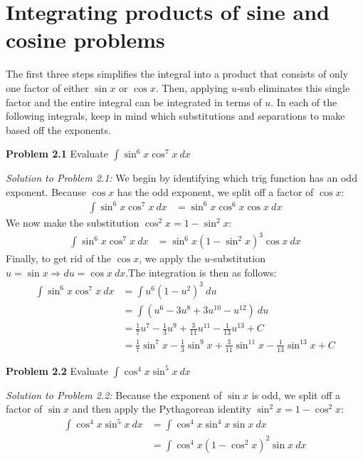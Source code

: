 \documentclass[11pt]{scrartcl}
\begin{document}
\section{Integrating products of sine and cosine problems}
\noindent 
The first three steps simplifies the integral into a product that consists of only one factor of either $\sin x$ or $\cos x$. Then, applying $u$-sub eliminates this single factor and the entire integral can be integrated in terms of $u$. In each of the following integrals, keep in mind which substitutions and separations to make based off the exponents. 
\begin{tcolorbox}[colback=purple!5!white,colframe=purple!75!black]
\textbf{Problem 2.1} Evaluate $\int{\sin ^6 x \cos ^7 x \ dx}$
\end{tcolorbox}
\noindent 
\textit{Solution to Problem 2.1:} We begin by identifying which trig function has an odd exponent. Because $\cos x$ has the odd exponent, we split off a factor of $\cos x$: 
\begin{align*}
    \int{\sin ^6 x \cos ^7 x \ dx} &=\sin ^6 x \cos ^6 x \cos x \ dx 
\end{align*}
\noindent 
We now make the substitution $\cos ^2 x=1- \sin ^2 x$: 
\begin{align*}
     \int{\sin ^6 x \cos ^7 x \ dx} &=\sin ^6 x(1- \sin ^2 x)^3 \cos x \ dx
\end{align*}
\noindent 
Finally, to get rid of the $\cos x$, we apply the $u$-substitution $u=\sin x \Rightarrow du=\cos x \ dx$.The integration is then as follows: 
\begin{align*}
     \int{\sin ^6 x \cos ^7 x \ dx} &=\int{u^6(1-u^2)^3 \ du} \\
     &=\int{(u^6-3u^8+3u^{10}-u^{12}) \ du} \\
     &=\frac{1}{7}u^7-\frac{1}{3}u^9+\frac{3}{11}u^{11}-\frac{1}{13}u^{13} + C \\
     &=\frac{1}{7}\sin ^7 x -\frac{1}{3} \sin ^9 x +\frac{3}{11} \sin ^{11} x -\frac{1}{13} \sin ^{13} x +C
\end{align*}
\begin{tcolorbox}[colback=purple!5!white,colframe=purple!75!black]
\textbf{Problem 2.2} Evaluate $\int \cos ^4 x \sin ^5 x \ dx$
\end{tcolorbox}
\noindent 
\textit{Solution to Problem 2.2:} Because the exponent of $\sin x$ is odd, we split off a factor of $\sin x$ and then apply the Pythagorean identity $\sin ^2 x=1- \cos ^2 x$: 
\begin{align*}
    \int{\cos ^4 x \sin ^5 x} \ dx &=\int {\cos ^4 x \sin ^4 x \sin x \ dx} \\
                                   &=\int{\cos ^4 x (1-\cos ^2 x)^2 \sin x \ dx} 
\end{align*}
\end{document}
